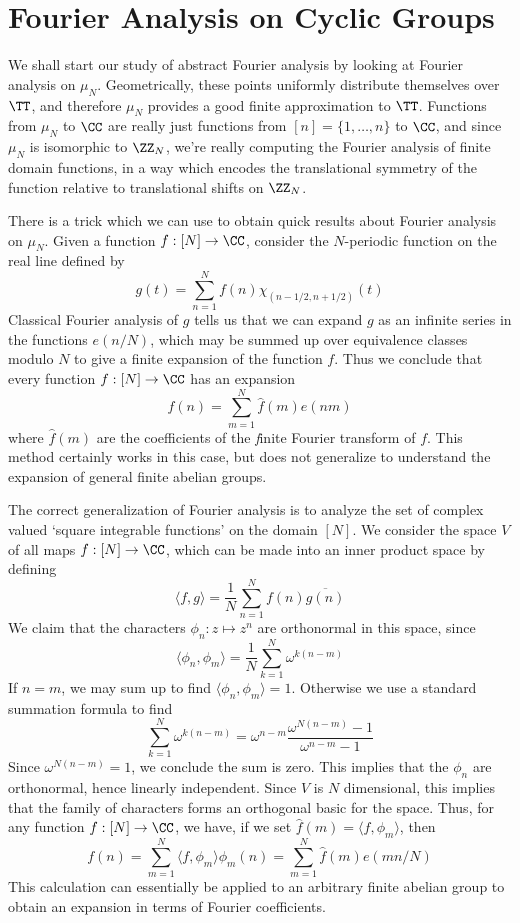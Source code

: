 \section{Fourier Analysis on Cyclic Groups}

We shall start our study of abstract Fourier analysis by looking at Fourier analysis on $\mu_N$. Geometrically, these points uniformly distribute themselves over $\TT$, and therefore $\mu_N$ provides a good finite approximation to $\TT$. Functions from $\mu_N$ to $\CC$ are really just functions from $[n] = \{ 1, \dots, n \}$ to $\CC$, and since $\mu_N$ is isomorphic to $\ZZ_N$, we're really computing the Fourier analysis of finite domain functions, in a way which encodes the translational symmetry of the function relative to translational shifts on $\ZZ_N$.

There is a trick which we can use to obtain quick results about Fourier analysis on $\mu_N$. Given a function $f: [N] \to \CC$, consider the $N$-periodic function on the real line defined by
%
\[ g(t) = \sum_{n = 1}^N f(n) \chi_{(n-1/2,n+1/2)}(t) \]
%
Classical Fourier analysis of $g$ tells us that we can expand $g$ as an infinite series in the functions $e(n/N)$, which may be summed up over equivalence classes modulo $N$ to give a finite expansion of the function $f$. Thus we conclude that every function $f: [N] \to \CC$ has an expansion
%
\[ f(n) = \sum_{m = 1}^N \widehat{f}(m) e(nm) \]
%
where $\widehat{f}(m)$ are the coefficients of the {\emph finite Fourier transform} of $f$. This method certainly works in this case, but does not generalize to understand the expansion of general finite abelian groups.

The correct generalization of Fourier analysis is to analyze the set of complex valued `square integrable functions' on the domain $[N]$. We consider the space $V$ of all maps $f: [N] \to \CC$, which can be made into an inner product space by defining
%
\[ \langle f, g \rangle = \frac{1}{N} \sum_{n = 1}^N f(n) \overline{g(n)} \]
%
We claim that the characters $\phi_n: z \mapsto z^n$ are orthonormal in this space, since
%
\[ \langle \phi_n, \phi_m \rangle = \frac{1}{N} \sum_{k = 1}^N \omega^{k(n-m)} \]
%
If $n = m$, we may sum up to find $\langle \phi_n, \phi_m \rangle = 1$. Otherwise we use a standard summation formula to find
%
\[ \sum_{k = 1}^N \omega^{k(n-m)} = \omega^{n-m} \frac{\omega^{N(n-m)} - 1}{\omega^{n-m} -1} \]
%
Since $\omega^{N(n-m)} = 1$, we conclude the sum is zero. This implies that the $\phi_n$ are orthonormal, hence linearly independent. Since $V$ is $N$ dimensional, this implies that the family of characters forms an orthogonal basic for the space. Thus, for any function $f: [N] \to \CC$, we have, if we set $\widehat{f}(m) = \langle f, \phi_m \rangle$, then
%
\[ f(n) = \sum_{m = 1}^N \langle f, \phi_m \rangle \phi_m(n) = \sum_{m = 1}^N \widehat{f}(m) e(mn/N) \]
%
This calculation can essentially be applied to an arbitrary finite abelian group to obtain an expansion in terms of Fourier coefficients.

